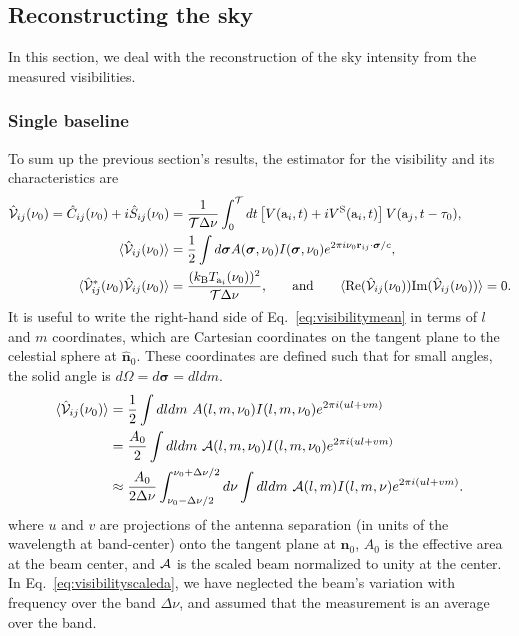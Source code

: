 \documentclass[11pt]{article}
\numberwithin{equation}{section}
\newcommand{\bt}[1]{\mathbf{#1}}
\begin{document}
\subsection{Reconstructing the sky}
\label{subsec:reconstruction}

In this section, we deal with the reconstruction of the sky intensity from the measured visibilities. 

\subsubsection{Single baseline}
\label{subsubsec:singlebl}

To sum up the previous section's results, the estimator for the visibility and its characteristics are
\begin{align}
  \hat{\cal V}_{ij}(\nu_0)  = \hat{C}_{ij}(\nu_0) + i \hat{S}_{ij}(\nu_0) & = \frac{1}{{\cal T}\Delta \nu} \int_0^{\cal T} dt \left[ V({\rm a}_i, t) + i V^{\rm S}({\rm a}_i, t) \right] V({\rm a}_j, t - \tau_0) \mbox{,} \label{eq:visibilityest} \\
  \langle \hat{\cal V}_{ij}(\nu_0) \rangle & = \frac12 \int d \bm{\sigma} A(\bm \sigma, \nu_0) I(\bm \sigma, \nu_0)  e^{ 2\pi i \nu_{0} \bt r_{ij} \cdot \bm \sigma/c } \mbox{,} \label{eq:visibilitymean} \\
  \langle \hat{\cal V}_{ij}^\ast(\nu_0) \hat{\cal V}_{ij}(\nu_0) \rangle & = \frac{( k_{\rm B} T_{{\rm a}_i}(\nu_0) )^2}{{\cal T} \Delta \nu} \mbox{,} \qquad {\rm and} \qquad \langle {\rm Re}(\hat{\cal V}_{ij}(\nu_0)) {\rm Im}(\hat{\cal V}_{ij}(\nu_0)) \rangle = 0 \mbox{.} \label{eq:visibilityvar}
\end{align}
It is useful to write the right-hand side of Eq.~\eqref{eq:visibilitymean} in terms of $l$ and $m$ coordinates, which are Cartesian coordinates on the tangent plane to the celestial sphere at $\hat{\bm n}_0$. These coordinates are defined such that for small angles, the solid angle is $d\Omega = d \bm{\sigma} = dl dm$.
\begin{align}
  \langle \hat{\cal V}_{ij}(\nu_0) \rangle & = \frac12 \int dl dm \ A(l, m, \nu_0) I(l, m, \nu_0)  e^{ 2\pi i (u l + v m)} \\
  & = \frac{A_0}{2} \int dl dm \ {\cal A}(l, m, \nu_0) I(l, m, \nu_0)  e^{ 2\pi i (u l + v m)} \\
  & \approx \frac{A_0}{2 \Delta \nu} \int_{\nu_0 - \Delta \nu/2}^{\nu_0 + \Delta \nu/2} d\nu \int dl dm \ {\cal A}(l, m) I(l, m, \nu) e^{ 2\pi i (u l + v m)} \mbox{.} \label{eq:visibilityscaleda}
\end{align}
where $u$ and $v$ are projections of the antenna separation (in units of the wavelength at band-center) onto the tangent plane at $\hat{\bm n}_0$, $A_0$ is the effective area at the beam center, and ${\cal A}$ is the scaled beam normalized to unity at the center. In Eq.~\eqref{eq:visibilityscaleda}, we have neglected the beam's variation with frequency over the band $\Delta \nu$, and assumed that the measurement is an average over the band. 
\end{document}
